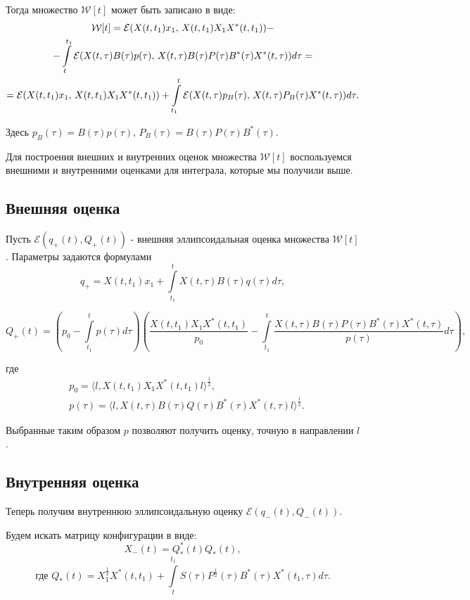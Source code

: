 \documentclass[16pt]{article}
\newcommand\Int[2]{\int\limits_{#1}^{#2}}
\begin{document}
Тогда множество $\mathcal{W}[t]$ может быть записано в виде:
\begin{multline}\notag
\mathcal{W}[t] = \mathcal{E}(X(t, t_1)x_1,\, X(t, t_1)X_1 X^*(t, t_1)) - \\-\int\limits_{t}^{t_1} \mathcal{E}(X(t, \tau)B(\tau) p(\tau),\, X(t, \tau) B(\tau) P(\tau) B^*(\tau) X^*(t, \tau))d\tau = \\ = \mathcal{E}(X(t, t_1)x_1,\, X(t, t_1)X_1 X^*(t, t_1)) +\int\limits_{t_1}^{t} \mathcal{E}(X(t, \tau)p_B(\tau),\, X(t, \tau) P_B(\tau) X^*(t, \tau))d\tau.
\end{multline}

Здесь $p_B(\tau) = B(\tau) p(\tau), \, P_B(\tau) = B(\tau) P(\tau) B^*(\tau).$

Для построения внешних и внутренних оценок множества $\mathcal{W}[t]$ воспользуемся внешними и внутренними оценками для интеграла, которые мы получили выше.

\subsection{Внешняя оценка}
Пусть $\mathcal{E}(q_{+}(t), Q_{+}(t))$ - внешняя эллипсоидальная оценка множества $\mathcal{W}[t]$. Параметры задаются формулами
$$
q_+ = X(t, t_1)x_1 + \Int{t_1}{t}X(t, \tau)B(\tau)q(\tau)d\tau,
$$

$$
Q_{+}(t) = \left( p_0 - \int\limits_{t_1}^{t} p(\tau)d\tau\right)\left(\dfrac{X(t, t_1)X_1 X^*(t, t_1)}{p_0} - \int\limits_{t_1}^{t} \dfrac{X(t, \tau)B(\tau)P(\tau) B^*(\tau) X^*(t, \tau)}{p(\tau)}d\tau\right),
$$ 

где 
$$
\begin{aligned} 
&p_0 = \langle l, X(t, t_1)X_1 X^*(t, t_1)l \rangle^{\frac{1}{2}},\\
&p(\tau) =\langle l, X(t, \tau) B(\tau) Q(\tau) B^*(\tau) X^*(t, \tau) l\rangle^{\frac{1}{2}}.
\end{aligned}
$$

Выбранные таким образом $p$ позволяют получить оценку, точную в направлении $l$.
\subsection{Внутренняя оценка}
Теперь получим внутреннюю эллипсоидальную оценку $\mathcal{E}(q_{-}(t), Q_{-}(t))$.

Будем искать матрицу конфигурации в виде:
$${X}_-(t) = Q_*^*(t)Q_*(t),$$
$$\text{где } Q_*(t) = X_1^\frac12X^*(t, t_1) + \Int{t}{t_1}S(\tau)P^{\frac12}(\tau)B^*(\tau)X^*(t_1, \tau)d\tau.$$
\end{document}
